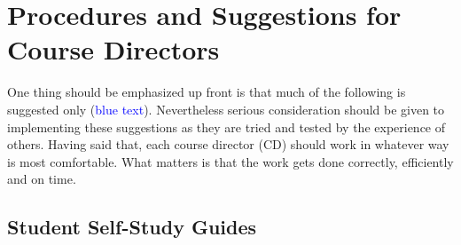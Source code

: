 \documentclass[11pt]{article}
\newcommand{\trsem}[1]{\textcolor{blue}{#1}}
\begin{document}
\section*{Procedures and Suggestions for Course Directors}

One thing should be emphasized up front is that much of the following is suggested only (\trsem{blue text}).  Nevertheless serious consideration should be given to implementing these suggestions as they are tried and tested by the experience of others.  Having said that, each course director (CD) should work in whatever way is most comfortable.  What matters is that the work gets done correctly, efficiently and on time.

\subsection*{Student Self-Study Guides}
\end{document}
